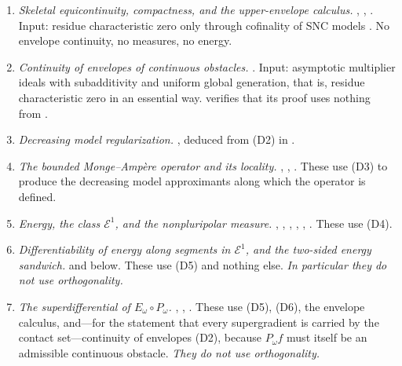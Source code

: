 \begin{enumerate}
\item[\textup{(D1)}]
\emph{Skeletal equicontinuity, compactness, and the upper-envelope
calculus.}
, ,
.  Input: residue characteristic zero only
through cofinality of SNC models .  No envelope
continuity, no measures, no energy.
\item[\textup{(D2)}]
\emph{Continuity of envelopes of continuous obstacles.}
.  Input: asymptotic multiplier ideals
with subadditivity and uniform global generation, that is, residue
characteristic zero in an essential way.   verifies
that its proof uses nothing from
.
\item[\textup{(D3)}]
\emph{Decreasing model regularization.}
, deduced from \textup{(D2)} in
.
\item[\textup{(D4)}]
\emph{The bounded Monge--Amp\`ere operator and its locality.}
, ,
.  These use \textup{(D3)} to produce
the decreasing model approximants along which the operator is defined.
\item[\textup{(D5)}]
\emph{Energy, the class $\mathcal E^1$, and the nonpluripolar measure.}
, ,
, ,
, .  These
use \textup{(D4)}.
\item[\textup{(D6)}]
\emph{Differentiability of energy along segments in $\mathcal E^1$, and
the two-sided energy sandwich.}
 and
 below.  These use \textup{(D5)} and
nothing else.  \emph{In particular they do not use orthogonality.}
\item[\textup{(D7)}]
\emph{The superdifferential of $E_\omega\circ P_\omega$.}
, ,
.  These use \textup{(D5)},
\textup{(D6)}, the envelope calculus, and---for the statement that every
supergradient is carried by the contact set---continuity of envelopes
\textup{(D2)}, because $P_\omega f$ must itself be an admissible
continuous obstacle.  \emph{They do not use orthogonality.}

\end{enumerate}
